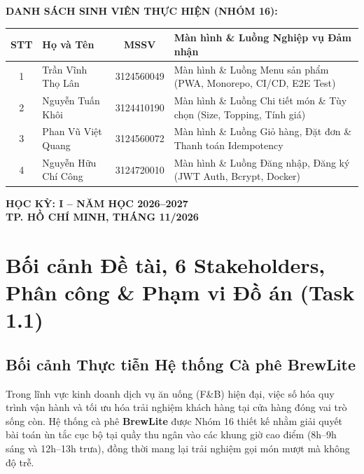\documentclass[a4paper]{article}
\begin{document}
\begin{titlepage}
\begin{singlespace}
\begin{center}
\textbf{DANH SÁCH SINH VIÊN THỰC HIỆN (NHÓM 16):} \\[0.15cm]
\begin{tabular}{|c|>{\raggedright\arraybackslash}p{4.2cm}|c|>{\raggedright\arraybackslash}p{6.5cm}|}
\hline
\textbf{STT} & \textbf{Họ và Tên} & \textbf{MSSV} & \textbf{Màn hình \& Luồng Nghiệp vụ Đảm nhận} \\ \hline
1 & Trần Vĩnh Thọ Lân & 3124560049 & Màn hình \& Luồng Menu sản phẩm (PWA, Monorepo, CI/CD, E2E Test) \\ \hline
2 & Nguyễn Tuấn Khôi & 3124410190 & Màn hình \& Luồng Chi tiết món \& Tùy chọn (Size, Topping, Tính giá) \\ \hline
3 & Phan Vũ Việt Quang & 3124560072 & Màn hình \& Luồng Giỏ hàng, Đặt đơn \& Thanh toán Idempotency \\ \hline
4 & Nguyễn Hữu Chí Công & 3124720010 & Màn hình \& Luồng Đăng nhập, Đăng ký (JWT Auth, Bcrypt, Docker) \\ \hline
\end{tabular}
\end{center}

\vspace{0.4cm}
\begin{center}
\textbf{HỌC KỲ: I -- NĂM HỌC 2026--2027} \\[0.1cm]
\textbf{TP. HỒ CHÍ MINH, THÁNG 11/2026}
\end{center}

\end{singlespace}
\end{titlepage}

\newpage
\tableofcontents
\newpage

\section{Bối cảnh Đề tài, 6 Stakeholders, Phân công \& Phạm vi Đồ án (Task 1.1)}

\subsection{Bối cảnh Thực tiễn Hệ thống Cà phê BrewLite}
Trong lĩnh vực kinh doanh dịch vụ ăn uống (F\&B) hiện đại, việc số hóa quy trình vận hành và tối ưu hóa trải nghiệm khách hàng tại cửa hàng đóng vai trò sống còn. Hệ thống cà phê \textbf{BrewLite} được Nhóm 16 thiết kế nhằm giải quyết bài toán ùn tắc cục bộ tại quầy thu ngân vào các khung giờ cao điểm (8h--9h sáng và 12h--13h trưa), đồng thời mang lại trải nghiệm gọi món mượt mà không độ trễ. 
\end{document}
